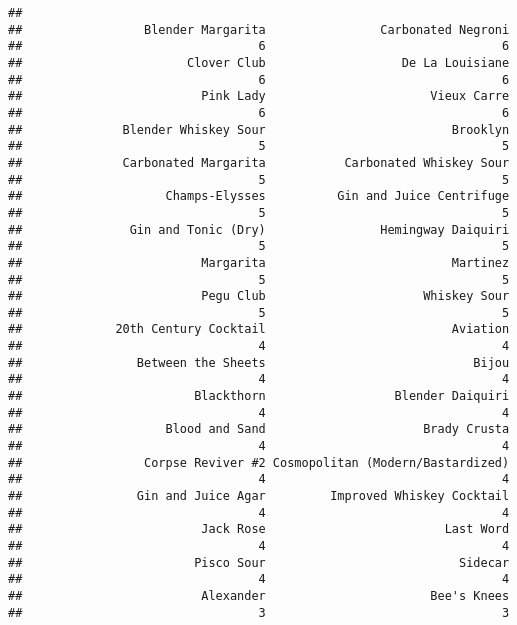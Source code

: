 \documentclass[
]{article}
\begin{document}
\begin{verbatim}
## 
##                 Blender Margarita                Carbonated Negroni 
##                                 6                                 6 
##                       Clover Club                   De La Louisiane 
##                                 6                                 6 
##                         Pink Lady                       Vieux Carre 
##                                 6                                 6 
##              Blender Whiskey Sour                          Brooklyn 
##                                 5                                 5 
##              Carbonated Margarita           Carbonated Whiskey Sour 
##                                 5                                 5 
##                    Champs-Elysses          Gin and Juice Centrifuge 
##                                 5                                 5 
##               Gin and Tonic (Dry)                Hemingway Daiquiri 
##                                 5                                 5 
##                         Margarita                          Martinez 
##                                 5                                 5 
##                         Pegu Club                      Whiskey Sour 
##                                 5                                 5 
##             20th Century Cocktail                          Aviation 
##                                 4                                 4 
##                Between the Sheets                             Bijou 
##                                 4                                 4 
##                        Blackthorn                  Blender Daiquiri 
##                                 4                                 4 
##                    Blood and Sand                      Brady Crusta 
##                                 4                                 4 
##                 Corpse Reviver #2 Cosmopolitan (Modern/Bastardized) 
##                                 4                                 4 
##                Gin and Juice Agar         Improved Whiskey Cocktail 
##                                 4                                 4 
##                         Jack Rose                         Last Word 
##                                 4                                 4 
##                        Pisco Sour                           Sidecar 
##                                 4                                 4 
##                         Alexander                       Bee's Knees 
##                                 3                                 3 

\end{verbatim}
\end{document}
